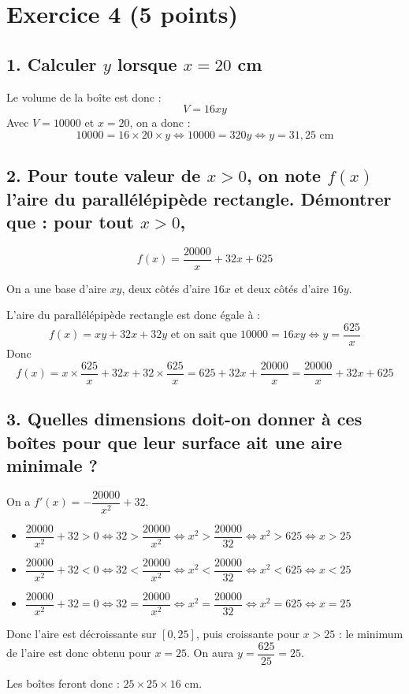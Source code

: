 \section*{Exercice 4 (5 points)}
	

	
	\subsection*{1. Calculer $y$ lorsque $x = 20$ cm}
	
	Le volume de la boîte est donc :
	\[
	V = 16xy
	\]
	Avec $V = 10000$ et $x = 20$, on a donc :
	\[
	10000 = 16 \times 20 \times y \iff 10000 = 320y \iff y = 31,25 \text{ cm}
	\]
	
	\subsection*{2. Pour toute valeur de $x > 0$, on note $f(x)$ l’aire du parallélépipède rectangle. Démontrer que : pour tout $x > 0$,}
	\[
	f(x) = \dfrac{20000}{x} + 32x + 625
	\]
	
	On a une base d’aire $xy$, deux côtés d’aire $16x$ et deux côtés d’aire $16y$.
	
	L’aire du parallélépipède rectangle est donc égale à :
	\[
	f(x) = xy + 32x + 32y \text{ et on sait que } 10000 = 16xy \iff y = \dfrac{625}{x}
	\]
	Donc
	\[
	f(x) = x \times \dfrac{625}{x} + 32x + 32 \times \dfrac{625}{x} = 625 + 32x + \dfrac{20000}{x} = \dfrac{20000}{x} + 32x + 625
	\]
	
	\subsection*{3. Quelles dimensions doit-on donner à ces boîtes pour que leur surface ait une aire minimale ?}
	
	On a $f'(x) = -\dfrac{20000}{x^2} + 32$.

	\begin{itemize}
		\item $\dfrac{20000}{x^2} + 32 > 0  \iff 32 > \dfrac{20000}{x^2} \iff x^2 > \dfrac{20000}{32} \iff x^2 > 625 \iff x > 25$
		\item $\dfrac{20000}{x^2} + 32 < 0  \iff 32 < \dfrac{20000}{x^2} \iff x^2 < \dfrac{20000}{32} \iff x^2 < 625 \iff x < 25$
		\item $\dfrac{20000}{x^2} + 32 = 0  \iff 32 = \dfrac{20000}{x^2} \iff x^2 = \dfrac{20000}{32} \iff x^2 = 625 \iff x = 25$
	\end{itemize}

	Donc l’aire est décroissante sur $[0, 25]$, puis croissante pour $x > 25$ : le minimum de l’aire est donc obtenu pour $x = 25$. On aura $y = \dfrac{625}{25} = 25$.
	
	Les boîtes feront donc : $25 \times 25 \times 16$ cm.
